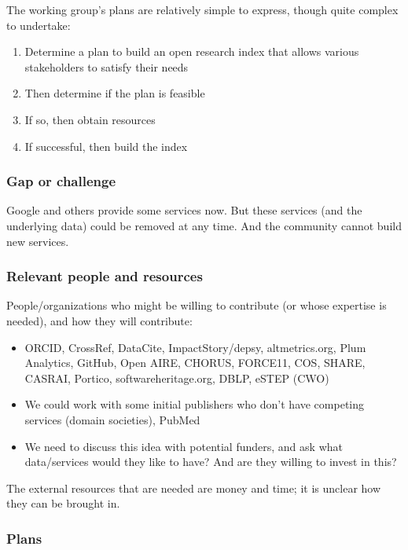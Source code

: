 The working group's plans are relatively simple to express, though quite complex to undertake:

\begin{enumerate}
\item Determine a plan to build an open research index that allows various stakeholders to satisfy their needs
\item Then determine if the plan is feasible
\item If so, then obtain resources
\item If successful, then build the index
\end{enumerate}

\subsubsection{Gap or challenge}

Google and others provide some services now.
But these services (and the underlying data) could be removed at any time.
And the community cannot build new services.

\subsubsection{Relevant people and resources}

People/organizations who might be willing to contribute (or whose expertise is needed), and how they will contribute:

\begin{itemize}
\item ORCID, CrossRef, DataCite, ImpactStory/depsy, altmetrics.org, Plum Analytics, GitHub, Open AIRE, CHORUS, FORCE11, COS, SHARE, CASRAI, Portico, softwareheritage.org, DBLP, eSTEP (CWO)
\item We could work with some initial publishers who don't have competing services (domain societies), PubMed
\item We need to discuss this idea with potential funders, and ask what data/services would they like to have?  And are they willing to invest in this?
\end{itemize}

The external resources that are needed are money and time; it is unclear how they can be brought in.

\subsubsection{Plans}

